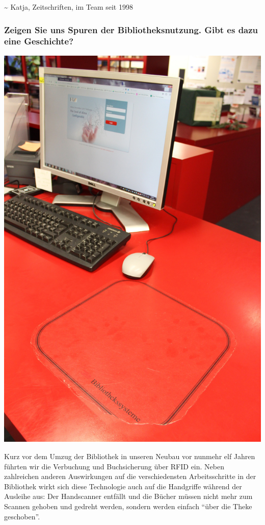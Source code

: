 \textasciitilde{} Katja, Zeitschriften, im Team seit 1998

\hypertarget{zeigen-sie-uns-spuren-der-bibliotheksnutzung.-gibt-es-dazu-eine-geschichte}{%
\subsubsection{Zeigen Sie uns Spuren der Bibliotheksnutzung. Gibt es dazu eine
Geschichte?}\label{zeigen-sie-uns-spuren-der-bibliotheksnutzung.-gibt-es-dazu-eine-geschichte}}

\begin{center}
\includegraphics{htw-dresden/img/RFIDpad.jpg}
\end{center}

Kurz vor dem Umzug der Bibliothek in unseren Neubau vor nunmehr elf
Jahren führten wir die Verbuchung und Buchsicherung über RFID ein. Neben
zahlreichen anderen Auswirkungen auf die verschiedensten Arbeitsschritte
in der Bibliothek wirkt sich diese Technologie auch auf die Handgriffe
während der Ausleihe aus: Der Handscanner entfällt und die Bücher müssen
nicht mehr zum Scannen gehoben und gedreht werden, sondern werden
einfach \enquote{über die Theke geschoben}.


